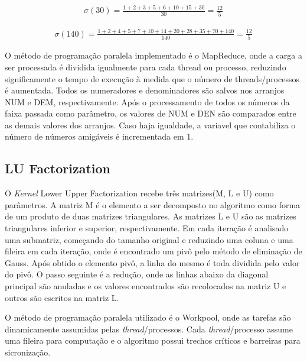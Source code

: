 \documentclass[12pt]{article}
\begin{document}
\begin{gather*}
{\sigma \left ( 30 \right )} =  \frac{1+2+3+5+6+10+15+30}{30} = \frac{12}{5}
\end{gather*}

\begin{gather*}
{\sigma \left ( 140 \right )} = \frac{1+2+4+5+7+10+14+20+28+35+70+140}{140}=\frac{12}{5}
\end{gather*}


O método de programação paralela implementado é o MapReduce, onde a carga a ser processada é dividida igualmente para cada thread ou processo, reduzindo significamente o tempo de execução à medida que o número de threads/processos é aumentada. Todos os numeradores e denominadores são salvos nos arranjos NUM e DEM, respectivamente. Após o processamento de todos os números da faixa passada como parâmetro,
os valores de NUM e DEN são comparados entre as demais valores dos arranjos. Caso haja igualdade, a variavel que contabiliza o número de números amigáveis é incrementada em 1.

\subsection{LU Factorization}

O \textit{Kernel} Lower Upper Factorization recebe três matrizes(M, L e U) como parâmetros. A matriz M é o elemento a ser decomposto no algoritmo como forma de um produto de duas matrizes triangulares. As matrizes L e U são as matrizes triangulares inferior e superior, respectivamente. Em cada iteração é analisado uma submatriz, começando do tamanho original e reduzindo uma coluna e uma fileira em cada iteração, onde é encontrado um pivô pelo método de eliminação de Gauss. Após obtido o elemento pivô, a linha do mesmo é toda dividida pelo valor do pivô. O passo seguinte é a redução, onde as linhas abaixo da diagonal principal são anuladas e os valores encontrados são recolocados na matriz U e outros são escritos na matriz L.

O método de programação paralela utilizado é o Workpool, onde as tarefas são dinamicamente assumidas pelas \textit{thread}/processos. Cada \textit{thread}/processo assume uma fileira para computação e o algoritmo possui trechos críticos e barreiras para sicronização. 
\end{document}
